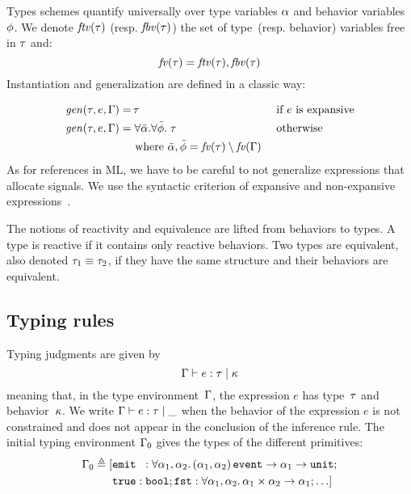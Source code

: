 \documentclass[9pt,preprint]{sigplanconf}
\newcommand{\deq}{\triangleq}
\begin{document}
Types schemes quantify universally over type variables $\alpha$ and behavior variables $\phi$. We denote $\mathit{ftv}(\tau)$ (resp. $\mathit{fbv}(\tau)$) the set of type~(resp. behavior) variables free in $\tau$ and:
\[ \mathit{fv}(\tau) = \mathit{ftv}(\tau), \mathit{fbv}(\tau) \] 
Instantiation and generalization are defined in a classic way:
\vspace{-1.3em}
\begin{align*}
\mathit{gen}(\tau, e, \Gamma) = &\, \tau && \text { if $e$ is expansive} \\
\mathit{gen}(\tau, e, \Gamma) = &\; \forall \bar{\alpha}.\forall \bar{\phi}.\; \tau  && \text{ otherwise } \\
  & \text{ where }  \bar{\alpha}, \bar{\phi} = \mathit{fv}(\tau) \setminus \mathit{fv}(\Gamma)  
\end{align*}
As for references in ML, we have to be careful to not generalize expressions that allocate signals. We use the syntactic criterion of expansive and non-expansive expressions~\cite{Tofte:1990}.

The notions of reactivity and equivalence are lifted from behaviors to types. A type is reactive if it contains only reactive behaviors. Two types are equivalent, also denoted $\tau_1 \equiv \tau_2$, if they have the same structure and their behaviors are equivalent.

\subsection{Typing rules}

Typing judgments are given by 
\[ \Gamma \vdash e : \tau \mid \kappa \] 
meaning that, in the type environment~$\Gamma$, the expression $e$ has type~$\tau$ and behavior~$\kappa$. We write $\Gamma \vdash e : \tau \mid \_$ when the behavior of the expression $e$ is not constrained and does not appear in the conclusion of the inference rule. The initial typing environment $\Gamma_0$ gives the types of the different primitives: 
\begin{align*}
\Gamma_0 \deq [
 &\eemit{}{} : \forall  \rtvar_1, \rtvar_2. \, 
        \rtarrow{ \rtsig{\rtvar_1}{\rtvar_2} }{\rtarrow{\rtvar_1}{\unit{}} }; \\
        &\mathtt{true} : \mathtt{bool};
              \mathtt{fst} : \forall \rtvar_1, \rtvar_2.\, \rtarrow{\rtprod{\rtvar_1}{\rtvar_2}}{\rtvar_1};  \ldots ]
\end{align*}
\end{document}
